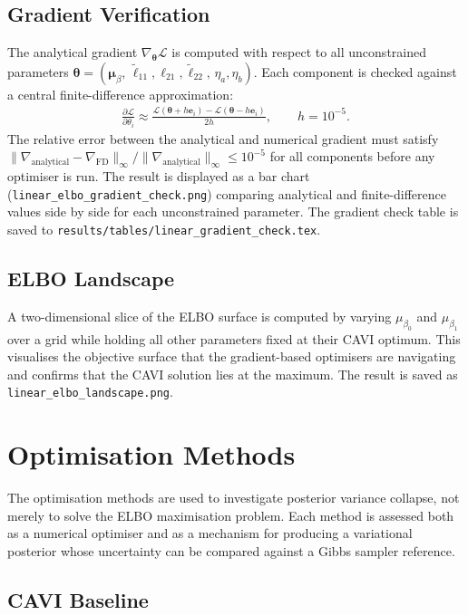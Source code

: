 \documentclass[11pt,a4paper]{article}
\begin{document}
\subsection{Gradient Verification}

The analytical gradient $\nabla_{\bm{\theta}}\mathcal{L}$ is computed with respect to all unconstrained
parameters $\bm{\theta} = (\bm{\mu}_\beta,\, \tilde{\ell}_{11}, \ell_{21}, \tilde{\ell}_{22},\, \eta_a, \eta_b)$.
Each component is checked against a central finite-difference approximation:
\begin{align}
  \frac{\partial \mathcal{L}}{\partial \theta_i} \approx \frac{\mathcal{L}(\bm{\theta} + h\bm{e}_i) - \mathcal{L}(\bm{\theta} - h\bm{e}_i)}{2h}, \qquad h = 10^{-5}.
\end{align}
The relative error between the analytical and numerical gradient must satisfy
$\|\nabla_{\mathrm{analytical}} - \nabla_{\mathrm{FD}}\|_\infty / \|\nabla_{\mathrm{analytical}}\|_\infty \leq 10^{-5}$
for all components before any optimiser is run.
The result is displayed as a bar chart (\texttt{linear\_elbo\_gradient\_check.png}) comparing analytical and
finite-difference values side by side for each unconstrained parameter.
The gradient check table is saved to \texttt{results/tables/linear\_gradient\_check.tex}.

\subsection{ELBO Landscape}

A two-dimensional slice of the ELBO surface is computed by varying $\mu_{\beta_0}$ and $\mu_{\beta_1}$
over a grid while holding all other parameters fixed at their CAVI optimum.
This visualises the objective surface that the gradient-based optimisers are navigating and confirms
that the CAVI solution lies at the maximum.
The result is saved as \texttt{linear\_elbo\_landscape.png}.

\section{Optimisation Methods}

The optimisation methods are used to investigate posterior variance collapse, not merely to solve the ELBO maximisation problem. Each method is assessed both as a numerical optimiser and as a mechanism for producing a variational posterior whose uncertainty can be compared against a Gibbs sampler reference.

\subsection{CAVI Baseline}
\end{document}
